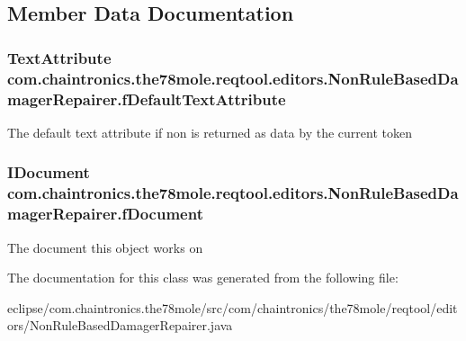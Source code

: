 \subsection{Member Data Documentation}
\subsubsection[{\texorpdfstring{f\+Default\+Text\+Attribute}{fDefaultTextAttribute}}]{\setlength{\rightskip}{0pt plus 5cm}Text\+Attribute com.\+chaintronics.\+the78mole.\+reqtool.\+editors.\+Non\+Rule\+Based\+Damager\+Repairer.\+f\+Default\+Text\+Attribute\hspace{0.3cm}{\ttfamily [protected]}}\hypertarget{classcom_1_1chaintronics_1_1the78mole_1_1reqtool_1_1editors_1_1NonRuleBasedDamagerRepairer_aaf7d93ad1383ad55542fe63398191204}{}\label{classcom_1_1chaintronics_1_1the78mole_1_1reqtool_1_1editors_1_1NonRuleBasedDamagerRepairer_aaf7d93ad1383ad55542fe63398191204}
The default text attribute if non is returned as data by the current token 
\subsubsection[{\texorpdfstring{f\+Document}{fDocument}}]{\setlength{\rightskip}{0pt plus 5cm}I\+Document com.\+chaintronics.\+the78mole.\+reqtool.\+editors.\+Non\+Rule\+Based\+Damager\+Repairer.\+f\+Document\hspace{0.3cm}{\ttfamily [protected]}}\hypertarget{classcom_1_1chaintronics_1_1the78mole_1_1reqtool_1_1editors_1_1NonRuleBasedDamagerRepairer_a6458e8b12d8a20efbd78d3a67dbbdd69}{}\label{classcom_1_1chaintronics_1_1the78mole_1_1reqtool_1_1editors_1_1NonRuleBasedDamagerRepairer_a6458e8b12d8a20efbd78d3a67dbbdd69}
The document this object works on 

The documentation for this class was generated from the following file\+:\begin{DoxyCompactItemize}
\item 
eclipse/com.\+chaintronics.\+the78mole/src/com/chaintronics/the78mole/reqtool/editors/Non\+Rule\+Based\+Damager\+Repairer.\+java\end{DoxyCompactItemize}
